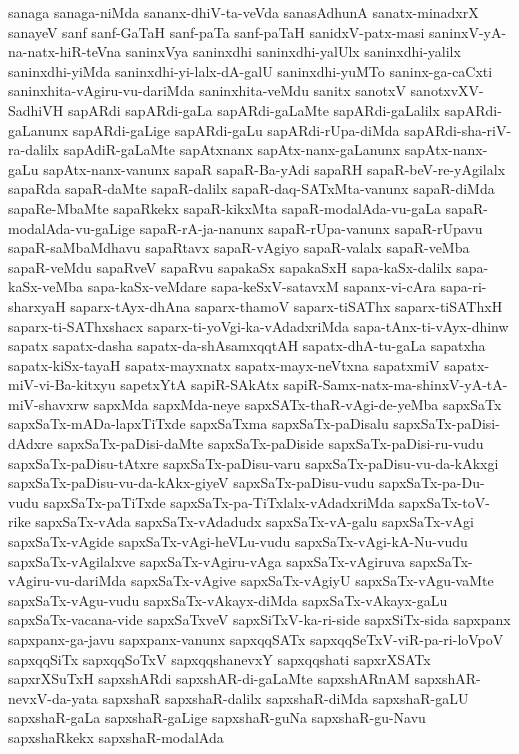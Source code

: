 {sanaga
sanaga-niMda
sananx-dhiV-ta-veVda
sanasAdhunA
sanatx-minadxrX
sanayeV
sanf
sanf-GaTaH
sanf-paTa
sanf-paTaH
sanidxV-patx-masi
saninxV-yA-na-natx-hiR-teVna
saninxVya
saninxdhi
saninxdhi-yalUlx
saninxdhi-yalilx
saninxdhi-yiMda
saninxdhi-yi-lalx-dA-galU
saninxdhi-yuMTo
saninx-ga-caCxti
saninxhita-vAgiru-vu-dariMda
saninxhita-veMdu
sanitx
sanotxV
sanotxvXV-SadhiVH
sapARdi
sapARdi-gaLa
sapARdi-gaLaMte
sapARdi-gaLalilx
sapARdi-gaLanunx
sapARdi-gaLige
sapARdi-gaLu
sapARdi-rUpa-diMda
sapARdi-sha-riV-ra-dalilx
sapAdiR-gaLaMte
sapAtxnanx
sapAtx-nanx-gaLanunx
sapAtx-nanx-gaLu
sapAtx-nanx-vanunx
sapaR
sapaR-Ba-yAdi
sapaRH
sapaR-beV-re-yAgilalx
sapaRda
sapaR-daMte
sapaR-dalilx
sapaR-daq-SATxMta-vanunx
sapaR-diMda
sapaRe-MbaMte
sapaRkekx
sapaR-kikxMta
sapaR-modalAda-vu-gaLa
sapaR-modalAda-vu-gaLige
sapaR-rA-ja-nanunx
sapaR-rUpa-vanunx
sapaR-rUpavu
sapaR-saMbaMdhavu
sapaRtavx
sapaR-vAgiyo
sapaR-valalx
sapaR-veMba
sapaR-veMdu
sapaRveV
sapaRvu
sapakaSx
sapakaSxH
sapa-kaSx-dalilx
sapa-kaSx-veMba
sapa-kaSx-veMdare
sapa-keSxV-satavxM
sapanx-vi-cAra
sapa-ri-sharxyaH
saparx-tAyx-dhAna
saparx-thamoV
saparx-tiSAThx
saparx-tiSAThxH
saparx-ti-SAThxshacx
saparx-ti-yoVgi-ka-vAdadxriMda
sapa-tAnx-ti-vAyx-dhinw
sapatx
sapatx-dasha
sapatx-da-shAsamxqqtAH
sapatx-dhA-tu-gaLa
sapatxha
sapatx-kiSx-tayaH
sapatx-mayxnatx
sapatx-mayx-neVtxna
sapatxmiV
sapatx-miV-vi-Ba-kitxyu
sapetxYtA
sapiR-SAkAtx
sapiR-Samx-natx-ma-shinxV-yA-tA-miV-shavxrw
sapxMda
sapxMda-neye
sapxSATx-thaR-vAgi-de-yeMba
sapxSaTx
sapxSaTx-mADa-lapxTiTxde
sapxSaTxma
sapxSaTx-paDisalu
sapxSaTx-paDisi-dAdxre
sapxSaTx-paDisi-daMte
sapxSaTx-paDiside
sapxSaTx-paDisi-ru-vudu
sapxSaTx-paDisu-tAtxre
sapxSaTx-paDisu-varu
sapxSaTx-paDisu-vu-da-kAkxgi
sapxSaTx-paDisu-vu-da-kAkx-giyeV
sapxSaTx-paDisu-vudu
sapxSaTx-pa-Du-vudu
sapxSaTx-paTiTxde
sapxSaTx-pa-TiTxlalx-vAdadxriMda
sapxSaTx-toV-rike
sapxSaTx-vAda
sapxSaTx-vAdadudx
sapxSaTx-vA-galu
sapxSaTx-vAgi
sapxSaTx-vAgide
sapxSaTx-vAgi-heVLu-vudu
sapxSaTx-vAgi-kA-Nu-vudu
sapxSaTx-vAgilalxve
sapxSaTx-vAgiru-vAga
sapxSaTx-vAgiruva
sapxSaTx-vAgiru-vu-dariMda
sapxSaTx-vAgive
sapxSaTx-vAgiyU
sapxSaTx-vAgu-vaMte
sapxSaTx-vAgu-vudu
sapxSaTx-vAkayx-diMda
sapxSaTx-vAkayx-gaLu
sapxSaTx-vacana-vide
sapxSaTxveV
sapxSiTxV-ka-ri-side
sapxSiTx-sida
sapxpanx
sapxpanx-ga-javu
sapxpanx-vanunx
sapxqqSATx
sapxqqSeTxV-viR-pa-ri-loVpoV
sapxqqSiTx
sapxqqSoTxV
sapxqqshanevxY
sapxqqshati
sapxrXSATx
sapxrXSuTxH
sapxshARdi
sapxshAR-di-gaLaMte
sapxshARnAM
sapxshAR-nevxV-da-yata
sapxshaR
sapxshaR-dalilx
sapxshaR-diMda
sapxshaR-gaLU
sapxshaR-gaLa
sapxshaR-gaLige
sapxshaR-guNa
sapxshaR-gu-Navu
sapxshaRkekx
sapxshaR-modalAda
}
